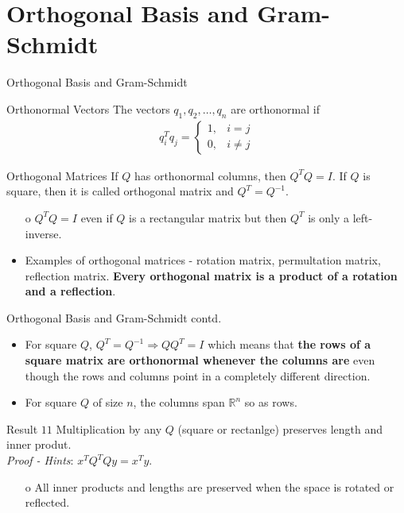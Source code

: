 \documentclass{beamer}
\begin{document}
\section{Orthogonal Basis and Gram-Schmidt}

\begin{frame}{Orthogonal Basis and Gram-Schmidt}
\begin{exampleblock}{Orthonormal Vectors}
The vectors $q_1, q_2, \ldots, q_n$ are orthonormal if
\begin{align*}
    q_i^Tq_j = \left\{\begin{matrix}1, & i = j\\0, & i \neq j\end{matrix}\right.
\end{align*}
\end{exampleblock}
\begin{exampleblock}{Orthogonal Matrices}
If $Q$ has orthonormal columns, then $Q^TQ = I$. If $Q$ is square, then it is called orthogonal matrix and $Q^T = Q^{-1}$.
\begin{itemize}
    \item[o] $Q^TQ = I$ even if $Q$ is a rectangular matrix but then $Q^T$ is only a left-inverse.
    \item Examples of orthogonal matrices - rotation matrix, permultation matrix, reflection matrix. \textbf{Every orthogonal matrix is a product of a rotation and a reflection}.
\end{itemize}
\end{exampleblock}
\end{frame}

\begin{frame}{Orthogonal Basis and Gram-Schmidt contd.}
\begin{itemize}
    \item For square $Q$, $Q^T = Q^{-1} \Rightarrow QQ^T = I$ which means that \textbf{the rows of a square matrix are orthonormal whenever the columns are} even though the rows and columns point in a completely different direction.
    \item For square $Q$ of size $n$, the columns span $\mathbb{R}^n$ so as rows.
\end{itemize}
\begin{block}{Result $11$}
Multiplication by any $Q$ (square or rectanlge) preserves length and inner produt.\\
\textit{Proof - Hints}: $x^TQ^TQy = x^Ty$.
\begin{itemize}
    \item[o] All inner products and lengths are preserved when the space is rotated or reflected.
\end{itemize}
\end{block}
\end{frame}
\end{document}
